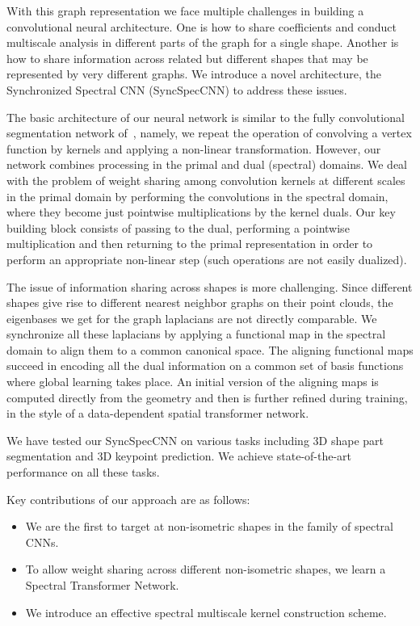 \documentclass[10pt,twocolumn,letterpaper]{article}
\newcommand{\denselist}{\itemsep 0pt\parsep=0pt\partopsep 0pt\vspace{-2pt}}
\newcommand{\bitem}{\begin{itemize}\denselist}
\newcommand{\eitem}{\end{itemize}}
\begin{document}
With this graph representation we face multiple challenges in building a convolutional neural architecture. One is how to share coefficients and conduct multiscale analysis in different parts of the graph for a single shape. Another is how to share information across related but different shapes that may be represented by very different graphs. We introduce a novel architecture, the Synchronized Spectral CNN (SyncSpecCNN) to address these issues. 

The basic architecture of our neural network is similar to the fully convolutional segmentation network of~\cite{long2015fully}, namely, we repeat the operation of convolving a vertex function by kernels and applying a non-linear transformation. However, our network combines processing in the primal and dual (spectral) domains. We deal with the problem of weight sharing among convolution kernels at different scales in the primal domain by performing the convolutions in the spectral domain, where they become just pointwise multiplications by the kernel duals. Our key building block consists of passing to the dual, performing a pointwise multiplication and then returning to the primal representation in order to perform an appropriate non-linear step (such operations are not easily dualized).

The issue of information sharing across shapes is more challenging.  Since different shapes give rise to different nearest neighbor graphs on their point clouds, the eigenbases we get for the graph laplacians are not directly comparable. We synchronize all these laplacians by applying a functional map in the spectral domain to align them to a common canonical space. The aligning functional maps succeed in encoding all the dual information on a common set of basis functions where global learning takes place. An initial version of the aligning maps is computed directly from the geometry and then is further refined during training, in the style of a data-dependent spatial transformer network. 



We have tested our SyncSpecCNN on various tasks including 3D shape part segmentation and 3D keypoint prediction. We achieve state-of-the-art performance on all these tasks.

Key contributions of our approach are as follows:\bitem
    \item We are the first to target at non-isometric shapes in the family of spectral CNNs.\item To allow weight sharing across different non-isometric shapes, we learn a Spectral Transformer Network.
\item We introduce an effective spectral multiscale kernel construction scheme. \eitem
\end{document}
